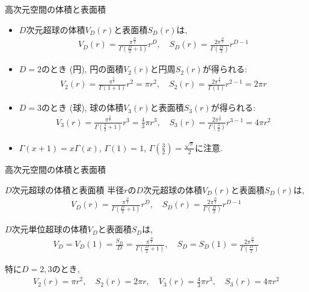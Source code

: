 \documentclass[dvipdfmx,notheorems,t]{beamer}
\begin{document}
\begin{frame}{高次元空間の体積と表面積}
\begin{itemize}
  \item $D$次元超球の体積$V_D(r)$と表面積$S_D(r)$は,
  \begin{align*}
    V_D(r) = \frac{\pi^\frac{D}{2}}{\Gamma \left( \frac{D}{2} + 1 \right)} r^D, \quad
    S_D(r) = \frac{2 \pi^\frac{D}{2}}{\Gamma \left( \frac{D}{2} \right)} r^{D - 1}
  \end{align*}

  \item $D = 2$のとき (円), 円の面積$V_2(r)$と円周$S_2(r)$が得られる:
  \begin{align*}
    V_2(r) = \frac{\pi^\frac{2}{2}}{\Gamma(1 + 1)} r^2 = \pi r^2, \quad
    S_2(r) = \frac{2 \pi^\frac{2}{2}}{\Gamma(1)} r^{2 - 1} = 2\pi r
  \end{align*}

  \item $D = 3$のとき (球), 球の体積$V_3(r)$と表面積$S_3(r)$が得られる:
  \begin{align*}
    V_3(r) = \frac{\pi^\frac{3}{2}}{\Gamma \left( \frac{3}{2} + 1 \right)} r^3
      = \frac{4}{3} \pi r^3, \quad
    S_3(r) = \frac{2 \pi^\frac{3}{2}}{\Gamma \left( \frac{3}{2} \right)} r^{3 - 1}
      = 4 \pi r^2
  \end{align*}

  \item $\Gamma(x + 1) = x \Gamma(x)$, $\Gamma(1) = 1$,
  $\Gamma \left( \frac{3}{2} \right) = \frac{\sqrt{\pi}}{2}$に注意.
\end{itemize}
\end{frame}

\begin{frame}{高次元空間の体積と表面積}
\begin{block}{$D$次元超球の体積と表面積}
  半径$r$の$D$次元超球の体積$V_D(r)$と表面積$S_D(r)$は,
  \begin{align*}
    V_D(r) = \frac{\pi^\frac{D}{2}}{\Gamma \left( \frac{D}{2} + 1 \right)} r^D, \quad
    S_D(r) = \frac{2 \pi^\frac{D}{2}}{\Gamma \left( \frac{D}{2} \right)} r^{D - 1}
  \end{align*}

  $D$次元単位超球の体積$V_D$と表面積$S_D$は,
  \begin{align*}
    V_D = V_D(1) = \frac{S_D}{D} = \frac{\pi^\frac{D}{2}}{\Gamma \left( \frac{D}{2} + 1 \right)}, \quad
    S_D = S_D(1) = \frac{2 \pi^\frac{D}{2}}{\Gamma \left( \frac{D}{2} \right)}
  \end{align*}

  特に$D = 2, 3$のとき,
  \begin{align*}
    V_2(r) = \pi r^2, \quad S_2(r) = 2\pi r, \quad
    V_3(r) = \frac{4}{3} \pi r^3, \quad S_3(r) = 4\pi r^2
  \end{align*}
\end{block}
\end{frame}
\end{document}
